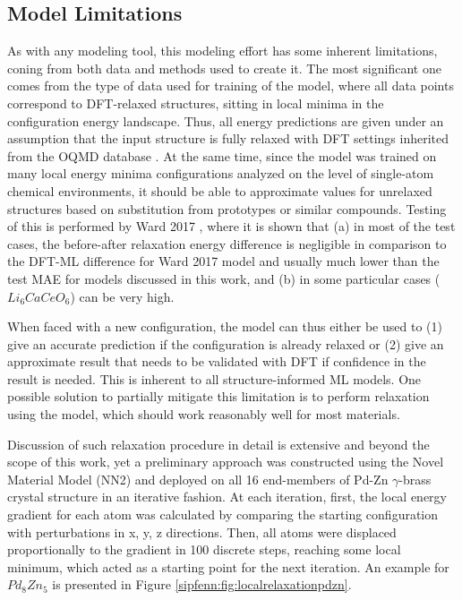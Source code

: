 \subsection{Model Limitations} \label{sipfenn:ssec:modellimitations}
As with any modeling tool, this modeling effort has some inherent limitations, coning from both data and methods used to create it. The most significant one comes from the type of data used for training of the model, where all data points correspond to DFT-relaxed structures, sitting in local minima in the configuration energy landscape. Thus, all energy predictions are given under an assumption that the input structure is fully relaxed with DFT settings inherited from the OQMD database \cite{Saal2013MaterialsOQMD}. At the same time, since the model was trained on many local energy minima configurations analyzed on the level of single-atom chemical environments, it should be able to approximate values for unrelaxed structures based on substitution from prototypes or similar compounds. Testing of this is performed by Ward 2017 \cite{Ward2017IncludingTessellations}, where it is shown that (a) in most of the test cases, the before-after relaxation energy difference is negligible in comparison to the DFT-ML difference for Ward 2017 model and usually much lower than the test MAE for models discussed in this work, and (b) in some particular cases ($Li_6CaCeO_6$) can be very high.

When faced with a new configuration, the model can thus either be used to (1) give an accurate prediction if the configuration is already relaxed or (2) give an approximate result that needs to be validated with DFT if confidence in the result is needed. This is inherent to all structure-informed ML models. One possible solution to partially mitigate this limitation is to perform relaxation using the model, which should work reasonably well for most materials. 

Discussion of such relaxation procedure in detail is extensive and beyond the scope of this work, yet a preliminary approach was constructed using the Novel Material Model (NN2) and deployed on all 16 end-members of Pd-Zn $\gamma$-brass crystal structure \cite{Dasgupta2022} in an iterative fashion. At each iteration, first, the local energy gradient for each atom was calculated by comparing the starting configuration with perturbations in x, y, z directions. Then, all atoms were displaced proportionally to the gradient in 100 discrete steps, reaching some local minimum, which acted as a starting point for the next iteration. An example for $Pd_8Zn_5$ is presented in Figure \ref{sipfenn:fig:localrelaxationpdzn}.

